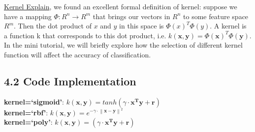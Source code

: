 \documentclass[12pt]{article}
\begin{document}
\href{https://stats.stackexchange.com/questions/152897/how-to-intuitively-explain-what-a-kernel-is}{Kernel Explain}, we found an excellent formal definition of kernel: suppose we have a mapping $\Phi:R^n \rightarrow R^m$ that brings our vectors in $R^n$ to some feature space $R^m$. Then the dot product of $x$ and $y$ in this space is $\Phi(x)^T \Phi(y)$. 
A kernel is a function k that corresponds to this dot product, i.e. $k(\mathbf{x},\mathbf{y}) = \Phi(\mathbf{x})^T \Phi(\mathbf{y})$. In the mini tutorial, we will briefly explore how the selection of different kernel function will affect the accuracy of classification.

\subsection*{4.2 Code Implementation}
\textbf{kernel=`sigmoid'}: $k(\mathbf{x},\mathbf{y}) = tanh(\gamma \cdot \mathbf{x^T}\mathbf{y}+\mathbf{r})$ \\
\textbf{kernel=`rbf'}: $k(\mathbf{x},\mathbf{y}) = e^{-\gamma \cdot \left\|\mathbf{x}-\mathbf{y}\right\|^2}$ \\
\textbf{kernel=`poly'}: $k(\mathbf{x},\mathbf{y}) = (\gamma \cdot \mathbf{x^T y} + \mathbf{r})$
\end{document}
